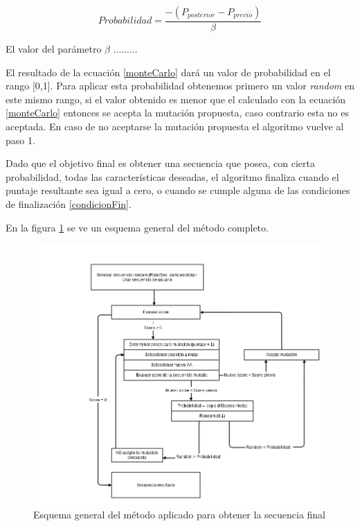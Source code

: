 \begin{enumerate}
    \begin{equation}\label{monteCarlo}
    Probabilidad =  \frac{-(P_{posterior}  - P_{previo}) } {\beta} 
    \end{equation}

    \normalsize
    El valor del parámetro $\beta$ .........
    
    El resultado de la ecuación \ref{monteCarlo} dará un valor de probabilidad en el rango [0,1]. 
    Para aplicar esta probabilidad obtenemos primero un valor \textit{random} en este mismo rango, si el valor obtenido es menor que el calculado con la ecuación \ref{monteCarlo} entonces se acepta la mutación propuesta, 
    caso contrario esta no es aceptada. 
    En caso de no aceptarse la mutación propuesta el algoritmo vuelve al paso 1.
    
    
\end{enumerate}





Dado que el objetivo final es obtener una secuencia que posea, con cierta probabilidad, todas las características deseadas, 
el algoritmo finaliza cuando el puntaje resultante sea igual a cero, o cuando se cumple alguna de las condiciones de finalización \ref{condicionFin}. 


En la figura \ref{fig:esquema-algoritmo} se ve un esquema general del método completo.



\begin{figure}[ht]
\centering
   \includegraphics[width=\textwidth]{img/diagrama-algoritmo.png}
 \caption{Esquema general del método aplicado para obtener la secuencia final}
 \label{fig:esquema-algoritmo}
\end{figure}



